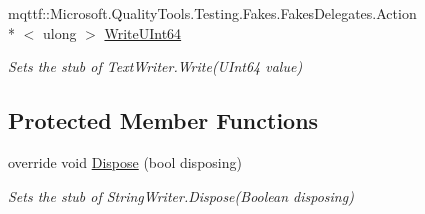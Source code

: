 \begin{DoxyCompactItemize}
mqttf\-::\-Microsoft.\-Quality\-Tools.\-Testing.\-Fakes.\-Fakes\-Delegates.\-Action\\*
$<$ ulong $>$ \hyperlink{class_system_1_1_i_o_1_1_fakes_1_1_stub_string_writer_a78a056362f60eebdab37075b85d0f7da}{Write\-U\-Int64}
\begin{DoxyCompactList}\small\item\em Sets the stub of Text\-Writer.\-Write(\-U\-Int64 value)\end{DoxyCompactList}\end{DoxyCompactItemize}
\subsection*{Protected Member Functions}
\begin{DoxyCompactItemize}
\item 
override void \hyperlink{class_system_1_1_i_o_1_1_fakes_1_1_stub_string_writer_a4197357ca5a383c924ba3111aca56650}{Dispose} (bool disposing)
\begin{DoxyCompactList}\small\item\em Sets the stub of String\-Writer.\-Dispose(\-Boolean disposing)\end{DoxyCompactList}\end{DoxyCompactItemize}
